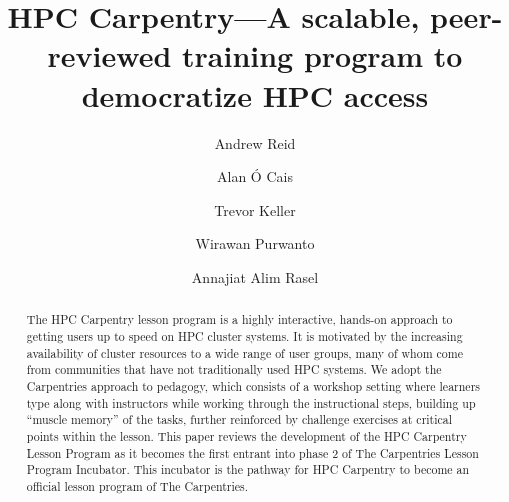 \documentclass[jocse]{jocseart}
\begin{document}
\title{HPC Carpentry---A scalable, peer-reviewed training program to democratize HPC access}

\author{Andrew Reid}

\author{Alan \'O Cais}

\author{Trevor Keller}

\author{Wirawan Purwanto}

\author{Annajiat Alim Rasel}



\begin{abstract}
The HPC Carpentry lesson program is a highly interactive, hands-on approach to getting users up to speed on HPC cluster systems. It is motivated by the increasing availability of cluster resources to a wide range of user groups, many of whom come from communities that have not traditionally used HPC systems.
We adopt the Carpentries approach to pedagogy, which consists of a workshop setting where learners type along with instructors while working through the instructional steps, building up ``muscle memory'' of the tasks, further reinforced by challenge exercises at critical points within the lesson. 
This paper reviews the development of the HPC Carpentry Lesson Program as it becomes the first entrant into phase 2 of The Carpentries Lesson Program Incubator. This incubator is the pathway for HPC Carpentry to become an official lesson program of The Carpentries.
\end{abstract}
\end{document}
